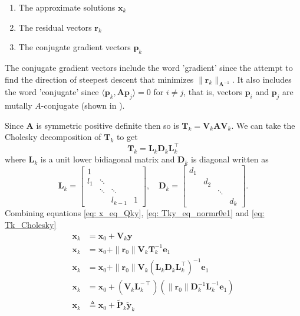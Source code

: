 \begin{enumerate}
    \item The approximate solutions $\bm{x}_{k}$
    \item The residual vectors $\bm{r}_{k}$
    \item The conjugate gradient vectors $\bm{p}_k$
\end{enumerate}
The conjugate gradient vectors include the word 'gradient' since the attempt to find the direction of steepest descent that minimizes $\| \bm{r}_{k} \|_{\bm{A}^{-1}}$. It also includes the word 'conjugate' since $\langle \bm{p}_k, \bm{A} \bm{p}_j \rangle = 0$ for $i \neq j$, that is, vectors $\bm{p}_i$ and $\bm{p}_j$ are mutally $A$-conjugate (shown in ).

Since $\bm{A}$ is symmetric positive definite then so is $\bm{T}_k  = \bm{V}_{k} \bm{A} \bm{V}_{k}$. We can take the Cholesky decomposition of $\bm{T}_k$ to get
\begin{equation} \label{eq: Tk_Cholesky}
    \bm{T}_k = \bm{L}_k \bm{D}_k \bm{L}_k^{\intercal}
\end{equation}
where $\bm{L}_k$ is a unit lower bidiagonal matrix and $\bm{D}_k$ is diagonal written as
\[
    \bm{L}_k =
    \begin{bmatrix}
        1   &        &         &   \\
        l_1 & \ddots &         &   \\
            & \ddots & \ddots  &   \\
            &        & l_{k-1} & 1
    \end{bmatrix}, \quad
    \bm{D}_k =
    \begin{bmatrix}
        d_1 &     &        &     \\
            & d_2 &        &     \\
            &     & \ddots &     \\
            &     &        & d_k
    \end{bmatrix}.
\]
Combining equations \ref{eq: x_eq_Qky}, \ref{eq: Tky_eq_normr0e1} and \ref{eq: Tk_Cholesky}
\begin{align*}
    \bm{x}_k & = \bm{x}_0 + \bm{V}_{k} \bm{y}                                                                                                  \\
    \bm{x}_k & = \bm{x}_0 + \| \bm{r}_0 \| \bm{V}_{k} \bm{T}_k^{-1} \bm{e}_1                                                                   \\
    \bm{x}_k & = \bm{x}_0 + \| \bm{r}_0 \| \bm{V}_{k} \left( \bm{L}_k \bm{D}_k \bm{L}_k^{\intercal} \right)^{-1} \bm{e}_1                      \\
    \bm{x}_k & = \bm{x}_0 + \left( \bm{V}_{k} \bm{L}_k^{-\intercal} \right) \left( \| \bm{r}_0 \| \bm{D}_k^{-1} \bm{L}_k^{-1} \bm{e}_1 \right) \\
    \bm{x}_k & \triangleq \bm{x}_0 + \tilde{\bm{P}}_k \tilde{\bm{y}}_k
\end{align*}
